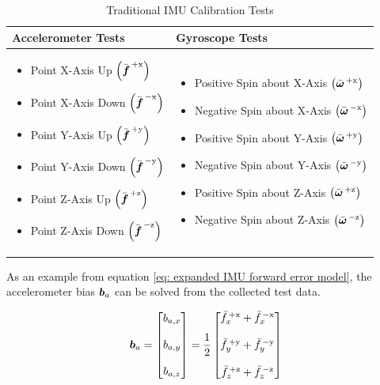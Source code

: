 \begin{table}[h!]
	\centering
	\begin{tabular}{|p{7cm}|p{7cm}|}
		\hline
		\textbf{Accelerometer Tests} & \textbf{Gyroscope Tests} \\ \hline
		\begin{itemize}
			\item Point X-Axis Up $\left(\bar{\boldsymbol{f}}^{\,+\textrm{x}}\right)$
			\item Point X-Axis Down $\left(\bar{\boldsymbol{f}}^{\,-\textrm{x}}\right)$
			\item Point Y-Axis Up $\left(\bar{\boldsymbol{f}}^{\,+\textrm{y}}\right)$
			\item Point Y-Axis Down $\left(\bar{\boldsymbol{f}}^{\,-\textrm{y}}\right)$
			\item Point Z-Axis Up $\left(\bar{\boldsymbol{f}}^{\,+\textrm{z}}\right)$
			\item Point Z-Axis Down $\left(\bar{\boldsymbol{f}}^{\,-\textrm{z}}\right)$
		\end{itemize}
		&
		\begin{itemize}
			\item Positive Spin about X-Axis $\left(\bar{\boldsymbol{\omega}}^{\,+\textrm{x}}\right)$
			\item Negative Spin about X-Axis $\left(\bar{\boldsymbol{\omega}}^{\,-\textrm{x}}\right)$
			\item Positive Spin about Y-Axis $\left(\bar{\boldsymbol{\omega}}^{\,+\textrm{y}}\right)$
			\item Negative Spin about Y-Axis $\left(\bar{\boldsymbol{\omega}}^{\,-\textrm{y}}\right)$
			\item Positive Spin about Z-Axis $\left(\bar{\boldsymbol{\omega}}^{\,+\textrm{z}}\right)$
			\item Negative Spin about Z-Axis $\left(\bar{\boldsymbol{\omega}}^{\,-\textrm{z}}\right)$
		\end{itemize} \\ \hline
	\end{tabular}
	\caption{Traditional IMU Calibration Tests}
	\label{tab: traditional_calibration_tests}
\end{table}
\FloatBarrier

As an example from equation \ref{eq: expanded IMU forward error model}, the accelerometer bias $\boldsymbol{b}_a$ can be solved from the collected test data.

\begin{align} 
	\boldsymbol{b}_a = \begin{bmatrix} b_{a,x} \\ \\ b_{a,y} \\ \\ b_{a,z} \end{bmatrix} = \frac{1}{2} \begin{bmatrix}
		\bar{f}^{\,+\textrm{x}}_{x} + \bar{f}^{\,-\textrm{x}}_{x} \\
		\\
		\bar{f}^{\,+\textrm{y}}_{y} + \bar{f}^{\,-\textrm{y}}_{y} \\
		\\
		\bar{f}^{\,+\textrm{z}}_{z} + \bar{f}^{\,-\textrm{z}}_{z}
	\end{bmatrix}
\end{align}

